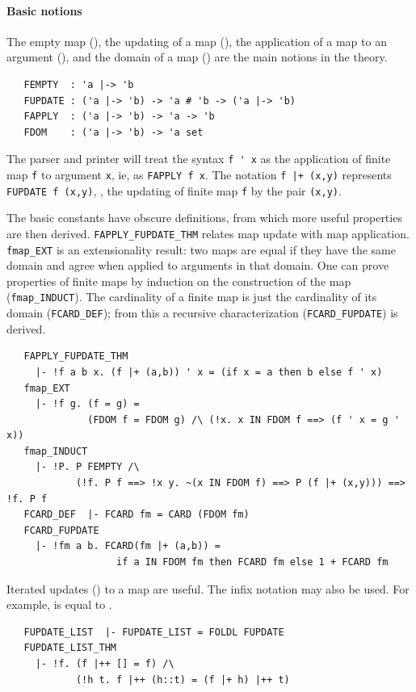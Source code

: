 \paragraph {Basic notions}

The empty map (), the updating of a map
(), the application of a map to an argument
(), and the domain of a map () are the
main notions in the theory.
\begin{hol}
\begin{verbatim}
   FEMPTY  : 'a |-> 'b
   FUPDATE : ('a |-> 'b) -> 'a # 'b -> ('a |-> 'b)
   FAPPLY  : ('a |-> 'b) -> 'a -> 'b
   FDOM    : ('a |-> 'b) -> 'a set
\end{verbatim}
\end{hol}

The \HOL{} parser and printer will treat the syntax \verb+f ' x+ as
the application of finite map \verb+f+ to argument \verb+x+, ie, as
{\small\verb+FAPPLY f x+}. The notation \verb#f |+ (x,y)# represents
{\small\verb+FUPDATE f (x,y)+}, \ie, the updating of finite map
\verb+f+ by the pair \verb+(x,y)+.

The basic constants have obscure definitions, from which more useful
properties are then derived. {\small\verb+FAPPLY_FUPDATE_THM+} relates
map update with map application.  {\small\verb+fmap_EXT+} is an
extensionality result: two maps are equal if they have the same domain
and agree when applied to arguments in that domain. One can prove
properties of finite maps by induction on the construction of the map
({\small\verb+fmap_INDUCT+}).  The cardinality of a finite map is
just the cardinality of its domain ({\small\verb+FCARD_DEF+}); from
this a recursive characterization ({\small\verb+FCARD_FUPDATE+}) is
derived.
\begin{hol}
\begin{verbatim}
   FAPPLY_FUPDATE_THM
     |- !f a b x. (f |+ (a,b)) ' x = (if x = a then b else f ' x)
   fmap_EXT
     |- !f g. (f = g) =
              (FDOM f = FDOM g) /\ (!x. x IN FDOM f ==> (f ' x = g ' x))
   fmap_INDUCT
     |- !P. P FEMPTY /\
            (!f. P f ==> !x y. ~(x IN FDOM f) ==> P (f |+ (x,y))) ==> !f. P f
   FCARD_DEF  |- FCARD fm = CARD (FDOM fm)
   FCARD_FUPDATE
     |- !fm a b. FCARD(fm |+ (a,b)) =
                   if a IN FDOM fm then FCARD fm else 1 + FCARD fm
\end{verbatim}
\end{hol}
Iterated updates () to a map are useful. The
infix notation \holtxt{|++} may also be used.  For example, \holtxt{fm
  |++ [(k1,v1); (k2,v2)]} is equal to \holtxt{(fm |+ (k1,v1)) |+
  (k2,v2)}.
\begin{hol}
\begin{verbatim}
   FUPDATE_LIST  |- FUPDATE_LIST = FOLDL FUPDATE
   FUPDATE_LIST_THM
     |- !f. (f |++ [] = f) /\
            (!h t. f |++ (h::t) = (f |+ h) |++ t)
\end{verbatim}
\end{hol}


